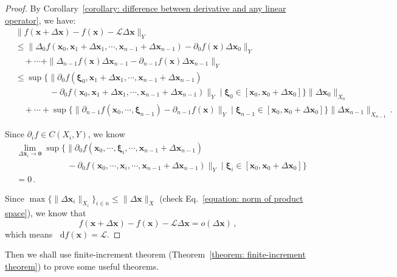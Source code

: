 \documentclass[openany]{book}
\theoremstyle{plain}
\theoremstyle{definition}
\newcommand{\dif}{\mathop{}\!\mathrm{d}} %
\newcommand*{\bv}{\boldsymbol} %
\begin{document}
\begin{proof}
	By Corollary~\ref{corollary: difference between derivative and any linear operator}, we have:
	\begin{align*}
		&\|f(\bv x + \Delta \bv x) - f(\bv x) - \mathscr L \Delta \bv x\|_Y 
		\\
		&\leq \|\Delta_0 f(\bv x_0, \bv x_1 + \Delta \bv x_1, \cdots, \bv x_{n-1} + \Delta \bv x_{n-1}) - \partial_0 f(\bv x)\Delta \bv x_0\|_Y
		\\
		&\quad + \cdots 
		 + \|\Delta_{n-1} f(\bv x) \Delta \bv x_{n-1} - \partial_{n-1} f(\bv x) \Delta \bv x_{n-1}\|_Y
		\\
		&\leq \sup\Big\{\big\|\partial_0 f(\bv \xi_0, \bv x_1 + \Delta \bv x_1, \cdots, \bv x_{n-1} + \Delta \bv x_{n-1}) 
		\\
			&\qquad\qquad - \partial_0 f(\bv x_0, \bv x_1 + \Delta \bv x_1, \cdots, \bv x_{n-1} + \Delta \bv x_{n-1})\big\|_Y
		\mid \bv \xi_0 \in [\bv x_0, \bv x_0 + \Delta \bv x_0]\Big\} 
			\|\Delta \bv x_0\|_{X_0}
		\\
		&\quad + \cdots 
		 + \sup\Big\{\big\|\partial_{n-1} f(\bv x_0, \cdots, \bv \xi_{n-1}) - \partial_{n-1} f(\bv x)\big\|_Y
		 \mid \bv \xi_{n-1} \in [\bv x_0, \bv x_0 + \Delta \bv x_0]\Big\} 
			 \|\Delta \bv x_{n-1}\|_{X_{n-1}} \,.
	\end{align*}

	Since $\partial_i f \in C(X_i, Y)$, we know
	\begin{align*}
		&\lim_{\Delta \bv x_i \to \bv 0}\sup\Big\{\big\|\partial_0 f(\bv x_0, \cdots, \bv \xi_i, \cdots, \bv x_{n-1} + \Delta \bv x_{n-1}) 
		\\
			&\qquad\qquad\qquad - \partial_0 f(\bv x_0, \cdots, \bv x_i, \cdots, \bv x_{n-1} + \Delta \bv x_{n-1})\big\|_Y
		\mid \bv \xi_i \in [\bv x_0, \bv x_0 + \Delta \bv x_0]\Big\} 
		\\
		&= 0\,.
	\end{align*}

	Since $\max\{\|\Delta \bv x_i\|_{X_{i}}\}_{i \in n} \leq \|\Delta \bv x\|_X$ (check Eq.~\eqref{equation: norm of product space}), we know that
	\begin{equation*}
		f(\bv x + \Delta \bv x) - f(\bv x) - \mathscr L \Delta \bv x
		= o(\Delta \bv x)\,,
	\end{equation*}
	which means $\dif f(\bv x) = \mathscr L$.
\end{proof}

Then we shall use finite-increment theorem (Theorem~\ref{theorem: finite-increment theorem}) to prove some useful theorems.
\end{document}
